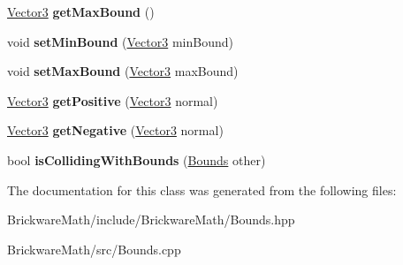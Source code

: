 \begin{DoxyCompactItemize}
\item 
\hypertarget{classBrickware_1_1Math_1_1Bounds_ac5176f2548b9330b6e70c50ebf36a291}{}\hyperlink{classBrickware_1_1Math_1_1Vector3}{Vector3} {\bfseries get\+Max\+Bound} ()\label{classBrickware_1_1Math_1_1Bounds_ac5176f2548b9330b6e70c50ebf36a291}

\item 
\hypertarget{classBrickware_1_1Math_1_1Bounds_a5b54c8d2af4e19e59f422e57f176118a}{}void {\bfseries set\+Min\+Bound} (\hyperlink{classBrickware_1_1Math_1_1Vector3}{Vector3} min\+Bound)\label{classBrickware_1_1Math_1_1Bounds_a5b54c8d2af4e19e59f422e57f176118a}

\item 
\hypertarget{classBrickware_1_1Math_1_1Bounds_a69d1168c23280da465b229eff7e6a8e1}{}void {\bfseries set\+Max\+Bound} (\hyperlink{classBrickware_1_1Math_1_1Vector3}{Vector3} max\+Bound)\label{classBrickware_1_1Math_1_1Bounds_a69d1168c23280da465b229eff7e6a8e1}

\item 
\hypertarget{classBrickware_1_1Math_1_1Bounds_a8540fcdc54e87500dbda4043fb8de591}{}\hyperlink{classBrickware_1_1Math_1_1Vector3}{Vector3} {\bfseries get\+Positive} (\hyperlink{classBrickware_1_1Math_1_1Vector3}{Vector3} normal)\label{classBrickware_1_1Math_1_1Bounds_a8540fcdc54e87500dbda4043fb8de591}

\item 
\hypertarget{classBrickware_1_1Math_1_1Bounds_a791c7c73d7e575104c623ab5d53c05f7}{}\hyperlink{classBrickware_1_1Math_1_1Vector3}{Vector3} {\bfseries get\+Negative} (\hyperlink{classBrickware_1_1Math_1_1Vector3}{Vector3} normal)\label{classBrickware_1_1Math_1_1Bounds_a791c7c73d7e575104c623ab5d53c05f7}

\item 
\hypertarget{classBrickware_1_1Math_1_1Bounds_aa8cb89ece500f5872ee91d88ea62d39a}{}bool {\bfseries is\+Colliding\+With\+Bounds} (\hyperlink{classBrickware_1_1Math_1_1Bounds}{Bounds} other)\label{classBrickware_1_1Math_1_1Bounds_aa8cb89ece500f5872ee91d88ea62d39a}

\end{DoxyCompactItemize}


The documentation for this class was generated from the following files\+:\begin{DoxyCompactItemize}
\item 
Brickware\+Math/include/\+Brickware\+Math/Bounds.\+hpp\item 
Brickware\+Math/src/Bounds.\+cpp\end{DoxyCompactItemize}
